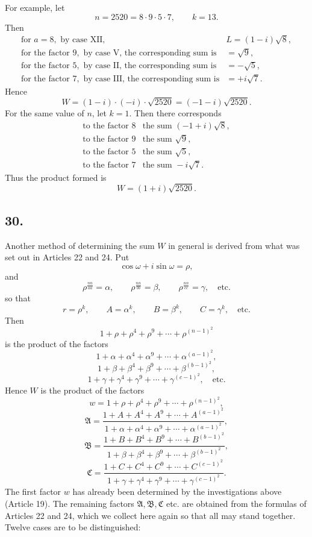 \documentclass[12pt]{article}
\begin{document}
For example, let
\[
n=2520=8\cdot9\cdot5\cdot7,\qquad k=13.
\]
Then
\[
\begin{array}{ll}
\text{for }a=8,\text{ by case XII,} & L=(1-i)\sqrt8,\\
\text{for the factor }9,\text{ by case V, the corresponding sum is} & =\sqrt9,\\
\text{for the factor }5,\text{ by case II, the corresponding sum is} & =-\sqrt5,\\
\text{for the factor }7,\text{ by case III, the corresponding sum is} & =+i\sqrt7.
\end{array}
\]
Hence
\[
W=(1-i)\cdot(-i)\cdot\sqrt{2520}=(-1-i)\sqrt{2520}.
\]
For the same value of $n$, let $k=1$. Then there corresponds
\[
\begin{array}{ll}
\text{to the factor }8 & \text{the sum }(-1+i)\sqrt8,\\
\text{to the factor }9 & \text{the sum }\sqrt9,\\
\text{to the factor }5 & \text{the sum }\sqrt5,\\
\text{to the factor }7 & \text{the sum }-i\sqrt7.
\end{array}
\]
Thus the product formed is
\[
W=(1+i)\sqrt{2520}.
\]

\subsection*{30.}

Another method of determining the sum $W$ in general is derived from what was set out in Articles 22 and 24. Put
\[
\cos\omega+i\sin\omega=\rho,
\]
and
\[
\rho^{\frac{nn}{aa}}=\alpha,\qquad
\rho^{\frac{nn}{bb}}=\beta,\qquad
\rho^{\frac{nn}{cc}}=\gamma,\quad\text{etc.}
\]
so that
\[
r=\rho^k,\qquad A=\alpha^k,\qquad B=\beta^k,\qquad C=\gamma^k,\quad\text{etc.}
\]
Then
\[
1+\rho+\rho^4+\rho^9+\cdots+\rho^{(n-1)^2}
\]
is the product of the factors
\[
1+\alpha+\alpha^4+\alpha^9+\cdots+\alpha^{(a-1)^2},
\]
\[
1+\beta+\beta^4+\beta^9+\cdots+\beta^{(b-1)^2},
\]
\[
1+\gamma+\gamma^4+\gamma^9+\cdots+\gamma^{(c-1)^2},\quad\text{etc.}
\]
Hence $W$ is the product of the factors
\[
w=1+\rho+\rho^4+\rho^9+\cdots+\rho^{(n-1)^2},
\]
\[
\mathfrak A=
\frac{1+A+A^4+A^9+\cdots+A^{(a-1)^2}}
{1+\alpha+\alpha^4+\alpha^9+\cdots+\alpha^{(a-1)^2}},
\]
\[
\mathfrak B=
\frac{1+B+B^4+B^9+\cdots+B^{(b-1)^2}}
{1+\beta+\beta^4+\beta^9+\cdots+\beta^{(b-1)^2}},
\]
\[
\mathfrak C=
\frac{1+C+C^4+C^9+\cdots+C^{(c-1)^2}}
{1+\gamma+\gamma^4+\gamma^9+\cdots+\gamma^{(c-1)^2}}.
\]
The first factor $w$ has already been determined by the investigations above (Article 19). The remaining factors $\mathfrak A,\mathfrak B,\mathfrak C$ etc. are obtained from the formulas of Articles 22 and 24, which we collect here again so that all may stand together. Twelve cases are to be distinguished:
\end{document}
